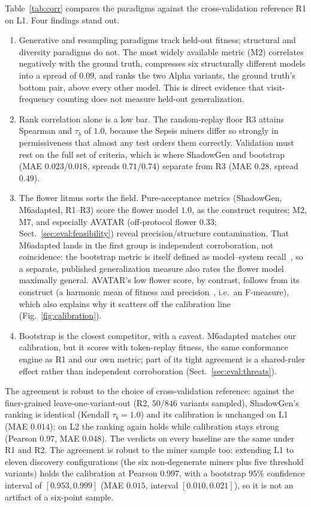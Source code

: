 \documentclass[runningheads]{llncs}
\newcommand{\chg}[1]{#1}
\begin{document}
Table~\ref{tab:corr} compares the paradigms against the cross-validation reference R1 on L1. Four findings stand out.
\begin{enumerate}
  \item Generative and resampling paradigms track held-out fitness; structural and diversity paradigms do not. The most widely available metric (M2) correlates negatively with the ground truth, compresses six structurally different models into a spread of \chg{$0.09$}, and \chg{ranks the two Alpha variants, the ground truth's bottom pair, above every other model}. This is direct evidence that visit-frequency counting does not measure held-out generalization.
  \item Rank correlation alone is a low bar. The random-replay floor R3 attains Spearman and $\tau_b$ of $1.0$, because the Sepsis miners differ so strongly in permissiveness that almost any test orders them correctly. Validation must rest on the full set of criteria, which is where \chg{ShadowGen} and bootstrap (MAE $0.023$/\chg{$0.018$}, spreads $0.71$/$0.74$) separate from R3 (MAE $0.28$, spread $0.49$).
  \item The flower litmus sorts the field. Pure-acceptance metrics (\chg{ShadowGen}, M6adapted, R1--R3) score the flower model $1.0$, as the construct requires; M2, M7, and \chg{especially AVATAR (off-protocol flower $0.33$; Sect.~\ref{sec:eval:feasibility})} reveal precision/structure contamination. That M6adapted lands in the first group is independent corroboration, not coincidence: the bootstrap metric is itself defined as model--system recall~\cite{polyvyanyy2022bootstrap}, so a separate, published generalization measure also rates the flower model maximally general. \chg{AVATAR's} low flower score, by contrast, follows from its construct (a harmonic mean of fitness and precision~\cite{theis2020avatar}, i.e.\ an F-measure), which also explains \chg{why it scatters off the calibration line (Fig.~\ref{fig:calibration})}.
  \item Bootstrap is the closest competitor, with a caveat. M6adapted matches our calibration, but it scores with token-replay fitness, the same conformance engine as R1 and our own metric; part of its tight agreement is a shared-ruler effect rather than independent corroboration (Sect.~\ref{sec:eval:threats}).
\end{enumerate}

The agreement is robust to the choice of cross-validation reference\chg{: against} the finer-grained leave-one-variant-out (R2\chg{, $50/846$ variants sampled}), ShadowGen's ranking is identical (Kendall $\tau_b{=}1.0$) and its calibration is unchanged on L1 (MAE $0.014$); on L2 the ranking again holds while calibration stays strong (Pearson $0.97$, MAE $0.048$). The verdicts on every baseline are the same under R1 and R2. \chg{The agreement is robust to the miner sample too: extending L1 to eleven discovery configurations (the six non-degenerate miners plus five threshold variants) holds the calibration at Pearson $0.997$, with a bootstrap $95\%$ confidence interval of $[0.953, 0.999]$ (MAE $0.015$, interval $[0.010, 0.021]$), so it is not an artifact of a six-point sample.}
\end{document}
